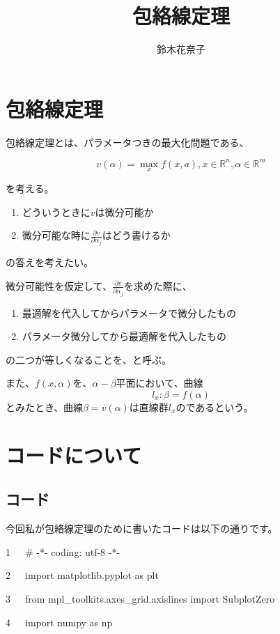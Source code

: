 \documentclass{jsarticle}
\begin{document}
\title{包絡線定理}
\author{鈴木花奈子}
\maketitle

\section{包絡線定理}

包絡線定理とは、パラメータつきの最大化問題である、

\[ v(\alpha)=\max_{x} f(x,a) , x\in \mathbb{R}^n , \alpha \in \mathbb{R}^m\]

を考える。

\begin{enumerate}
\item どういうときに$v$は微分可能か
\item 微分可能な時に$\frac{\partial v}{\partial\alpha_{j}}$はどう書けるか
\end{enumerate}
の答えを考えたい。

微分可能性を仮定して、$\frac{\partial v}{\partial\alpha_{j}}$を求めた際に、
\begin{enumerate}
\item 最適解を代入してからパラメータで微分したもの
\item パラメータ微分してから最適解を代入したもの
\end{enumerate}
の二つが等しくなることを、と呼ぶ。
　　　　　　　　　　　

また、$f(x,\alpha)$を、$\alpha-\beta$平面において、曲線
\[ l_{x}: \beta=f(\alpha)\]
とみたとき、曲線$\beta=v(\alpha)$は直線群$l_{x}$のであるという。

\pagebreak
\section{コードについて}
\subsection{コード}
今回私が包絡線定理のために書いたコードは以下の通りです。

                      

1~~~\# -*- coding: utf-8 -*-

2~~~import matplotlib.pyplot as plt

3~~~from mpl\_toolkits.axes\_grid.axislines import SubplotZero

4~~~import numpy as np
\end{document}
